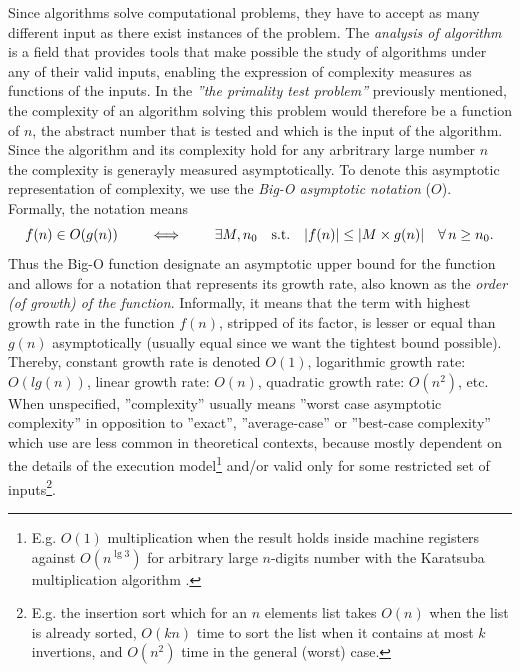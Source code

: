 	Since algorithms solve computational problems, they have to accept as many different input as there exist instances of the problem.
	The \emph{analysis of algorithm} is a field that provides tools that make possible the study of algorithms under any of their valid inputs, enabling the expression of complexity measures as functions of the inputs.
	In the \textit{''the primality test \emph{problem}''} previously mentioned, the complexity of an algorithm solving this problem would therefore be a function of $n$, the abstract number that is tested and which is the input of the algorithm.
	Since the algorithm and its complexity hold for any arbritrary large number $n$ the complexity is generayly measured asymptotically.
	To denote this asymptotic representation of complexity, we use the \emph{Big-O asymptotic notation} ($O$).
	Formally, the notation means \[ f(n) \in O(g(n)) \qquad \iff \qquad \exists M,n_0 \quad \text{s.t.}\quad \lvert f(n)\rvert \leq \lvert M\times{}g(n)\rvert \quad \forall\, n\geq n_0.\]
	Thus the Big-O function designate an asymptotic upper bound for the function and allows for a notation that represents its growth rate, also known as the \emph{order (of growth) of the function}.
	Informally, it means that the term with highest growth rate in the function $f(n)$, stripped of its factor, is lesser or equal than $g(n)$ asymptotically (usually equal since we want the tightest bound possible).
	Thereby, constant growth rate is denoted $O\left(1\right)$, logarithmic growth rate: $O\left(lg\left(n\right)\right)$, linear growth rate: $O\left(n\right)$, quadratic growth rate: $O\left(n^2\right)$, etc.
	When unspecified, ''complexity'' usually means ''worst case asymptotic complexity'' in opposition to ''exact'', ''average-case'' or ''best-case complexity'' which use are less common in theoretical contexts, because mostly dependent on the details of the execution model\footnote{E.g. $O\left(1\right)$ multiplication when the result holds inside machine registers against $O\left(n^{\lg 3}\right)$ for arbitrary large $n$-digits number with the Karatsuba multiplication algorithm \parencite{karatsuba1963multiplication}.} and/or valid only for some restricted set of inputs\footnote{E.g. the insertion sort which for an $n$ elements list takes $O(n)$ when the list is already sorted, $O(kn)$ time to sort the list when it contains at most $k$ invertions, and $O(n^2)$ time in the general (worst) case.}.

